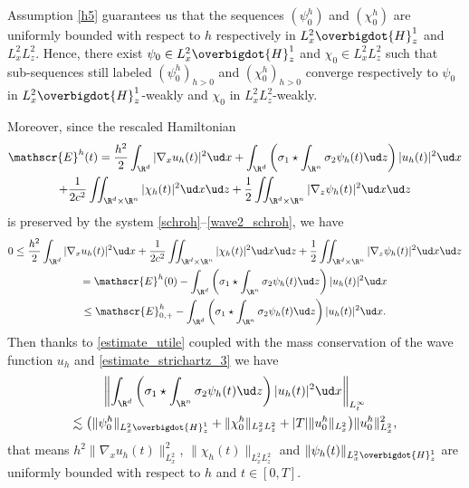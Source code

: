 \skpt
\begin{rmk}\label{rmk_h5}
\begin{enumeratei}
\item
Assumption \eqref{h5} guarantees us that the sequences $(\psi_{0}^{h})$ and $(\chi_{0}^{h})$ are uniformly bounded with respect to $h$ respectively in $L_{x}^{2}\overbigdot{H}_{z}^{1}$ and $L_{x}^{2}L_{z}^{2}$. Hence, there exist $\psi_{0}\in L_{x}^{2}\overbigdot{H}_{z}^{1}$ and $\chi_{0}\in L_{x}^{2}L_{z}^{2}$ such that sub-sequences still labeled $(\psi_{0}^{h})_{h>0}$ and $(\chi_{0}^{h})_{h>0}$ converge respectively to $\psi_{0}$ in $L_{x}^{2}\overbigdot{H}_{z}^{1}$-weakly and $\chi_{0}$ in $L_{x}^{2}L_{z}^{2}$-weakly.

\item
Moreover, since the rescaled Hamiltonian
\begin{multline*}
\mathscr{E}^{h}(t)=\frac{h^{2}}{2}\int_{\R^{d}}|\nabla_{x}u_{h}(t)|^{2}\ud x+\int_{\R^{d}}\left(\sigma_{1}\star\int_{\R^{n}}\sigma_{2}\psi_{h}(t)\ud z\right)|u_{h}(t)|^{2}\ud x\\
+\frac{1}{2c^{2}}\iint_{\R^{d}\times\R^{n}}|\chi_{h}(t)|^{2}\ud x\ud z+\frac{1}{2}\iint_{\R^{d}\times\R^{n}}|\nabla_{z}\psi_{h}(t)|^{2}\ud x\ud z
\end{multline*}
is preserved by the system \eqref{schroh}--\eqref{wave2_schroh}, we have
\bgroup
{}
\begin{multline*}
0\leq\frac{h^{2}}{2}\int_{\R^{d}}|\nabla_{x}u_{h}(t)|^{2}\ud x+\frac{1}{2c^{2}}\iint_{\R^{d}\times\R^{n}}|\chi_{h}(t)|^{2}\ud x\ud z+\frac{1}{2}\iint_{\R^{d}\times\R^{n}}|\nabla_{z}\psi_{h}(t)|^{2}\ud x\ud z\\
= \mathscr{E}^{h}(0)-\int_{\R^{d}}\left(\sigma_{1}\star\int_{\R^{n}}\sigma_{2}\psi_{h}(t)\ud z\right)|u_{h}(t)|^{2}\ud x\\
\leq \mathscr{E}_{0,+}^{h}-\int_{\R^{d}}\left(\sigma_{1}\star\int_{\R^{n}}\sigma_{2}\psi_{h}(t)\ud z\right)|u_{h}(t)|^{2}\ud x.
\end{multline*}
\egroup
Then thanks to \eqref{estimate_utile} coupled with the mass conservation of the wave function $u_{h}$ and \eqref{estimate_strichartz_3} we have
\begin{multline*}
\left\|\int_{\R^{d}}\left(\sigma_{1}\star\int_{\R^{n}}\sigma_{2}\psi_{h}(t)\ud z\right)|u_{h}(t)|^{2}\ud x\right\|_{L_{t}^{\infty}}\\
\lesssim\bigl(\|\psi_{0}^{h}\|_{L_{x}^{2}\overbigdot{H}_{z}^{1}}+\|\chi_{0}^{h}\|_{L_{x}^{2}L_{z}^{2}}+|T|\|u_{0}^{h}\|_{L_{x}^{2}}\bigr)\|u_{0}^{h}\|_{L_{x}^{2}}^{2},
\end{multline*}
that means $h^{2}\|\nabla_{x}u_{h}(t)\|_{L_{x}^{2}}^{2}$, $\|\chi_{h}(t)\|_{L_{x}^{2}L_{z}^{2}}$ and $\|\psi_{h}(t)\|_{L_{x}^{2}\overbigdot{H}_{z}^{1}}$ are uniformly bounded with respect to $h$ and $t\in[0,T]$.
\end{enumeratei}
\end{rmk}

